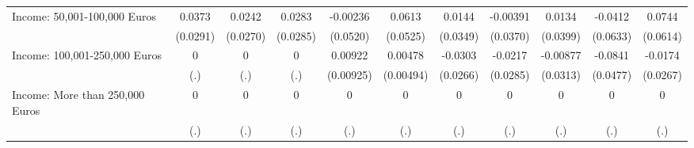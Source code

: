 {\begin{tabular}{l*{10}{c}}
Income: 50,001-100,000 Euros&      0.0373         &      0.0242         &      0.0283         &    -0.00236         &      0.0613         &      0.0144         &    -0.00391         &      0.0134         &     -0.0412         &      0.0744         \\
            &    (0.0291)         &    (0.0270)         &    (0.0285)         &    (0.0520)         &    (0.0525)         &    (0.0349)         &    (0.0370)         &    (0.0399)         &    (0.0633)         &    (0.0614)         \\
\addlinespace
Income: 100,001-250,000 Euros&           0         &           0         &           0         &     0.00922         &     0.00478         &     -0.0303         &     -0.0217         &    -0.00877         &     -0.0841         &     -0.0174         \\
            &         (.)         &         (.)         &         (.)         &   (0.00925)         &   (0.00494)         &    (0.0266)         &    (0.0285)         &    (0.0313)         &    (0.0477)         &    (0.0267)         \\
\addlinespace
Income: More than 250,000 Euros&           0         &           0         &           0         &           0         &           0         &           0         &           0         &           0         &           0         &           0         \\
            &         (.)         &         (.)         &         (.)         &         (.)         &         (.)         &         (.)         &         (.)         &         (.)         &         (.)         &         (.)         \\
\bottomrule
\end{tabular}
}
